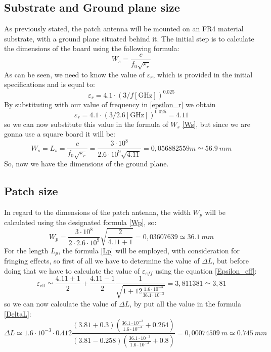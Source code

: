 \documentclass[]{article}
\begin{document}
	\subsection{Substrate and Ground plane size}
	As previously stated, the patch antenna will be mounted on an FR4 material substrate, with a ground plane situated behind it. The initial step is to calculate the dimensions of the board using the following formula:
	\begin{equation}
		W_s=\frac{c}{f_0 \sqrt{\varepsilon_r}}
		\label{Ws}
	\end{equation}
	As can be seen, we need to know the value of $\varepsilon_r$, which is provided in the initial specifications and is equal to:
	\begin{equation}
		\varepsilon_r = 4.1 \cdot (3/f[\text{GHz}])^{0.025}
		\label{epsilon_r}
	\end{equation}
	By substituting with our value of frequency in \eqref{epsilon_r} we obtain \[\varepsilon_r = 4.1 \cdot (3/2.6[\text{GHz}])^{0.025}=4.11\] 
	so we can now substitute this value in the formula of $W_s$ \eqref{Ws}, but since we are gonna use a square board it will be: \[W_s=L_s=\frac{c}{f_0 \sqrt{\varepsilon_r}}=\frac{3 \cdot 10^8}{2.6 \cdot 10^9\sqrt{4.11}}=0,056882559 m \simeq 56.9\ mm \]
So, now we have the dimensions of the ground plane.
\subsection{Patch size}
In regard to the dimensions of the patch antenna, the width $W_p$ will be calculated using the designated formula \eqref{Wp}, so: 
\[W_p=\frac{3 \cdot 10^8}{2 \cdot 2.6 \cdot 10^9}\sqrt{\frac{2}{4.11+1}}=0,03607639
 \simeq 36.1 \ mm\]
For the length $L_p$, the formula \eqref{Lp} will be employed, with consideration for fringing effects, so first of all we have to determine the value of $\Delta L$, but before doing that we have to calculate the value of $\varepsilon_{eff}$ using the equation \eqref{Epsilon_eff}:
\[\varepsilon_\text{eff} \simeq \frac{4.11 + 1}{2} + \frac{4.11 - 1}{2} \frac{1}{\sqrt{1 + 12 \frac{1.6 \cdot 10^{-3}}{36.1 \cdot 10^{-3}}}}=3,811381 \simeq 3,81\]
so we can now calculate the value of $\Delta L$, by put all the value in the formula \eqref{DeltaL}:
\[	\Delta L \simeq 1.6 \cdot 10^{-3} \cdot 0.412 \frac{\left( 3.81 + 0.3 \right) \left( \frac{36.1 \cdot 10^{-3}}{1.6\cdot 10^{-3}} + 0.264 \right)}{\left( 3.81 - 0.258 \right) \left( \frac{36.1\cdot 10^{-3}}{1.6 \cdot 10^{-3}} + 0.8 \right)} = 0,00074509
\ m \simeq 0.745 \ mm
\]
\end{document}
